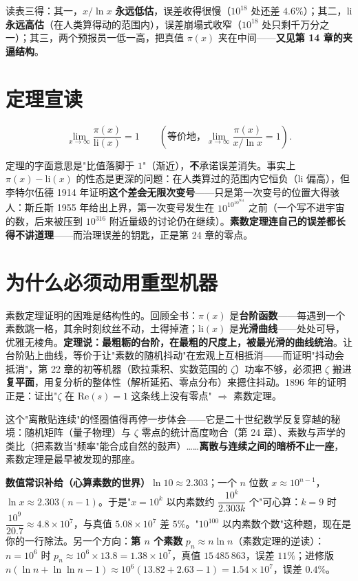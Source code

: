 读表三得：其一，$x/\ln x$ \textbf{永远低估}，误差收得很慢（$10^{18}$ 处还差 $4.6\%$）；其二，$\mathrm{li}$ \textbf{永远高估}（在人类算得动的范围内），误差崩塌式收窄（$10^{18}$ 处只剩千万分之一）；其三，两个预报员一低一高，把真值 $\pi(x)$ 夹在中间——\textbf{又见第 14 章的夹逼结构}。

\section{定理宣读}

\begin{dingli}
\[
\lim_{x \to \infty} \frac{\pi(x)}{\mathrm{li}(x)} = 1
\qquad\left(\text{等价地，} \lim_{x\to\infty} \frac{\pi(x)}{x/\ln x} = 1\right).
\]
\end{dingli}

定理的字面意思是"比值落脚于 $1$"（渐近），\textbf{不}承诺误差消失。事实上 $\pi(x) - \mathrm{li}(x)$ 的性态是更深的问题：在人类算过的范围内它恒负（$\mathrm{li}$ 偏高），但李特尔伍德 1914 年证明\textbf{这个差会无限次变号}——只是第一次变号的位置大得骇人：斯丘斯 1955 年给出上界，第一次变号发生在 $10^{10^{10^{964}}}$ 之前（一个写不进宇宙的数，后来被压到 $10^{316}$ 附近量级的讨论仍在继续）。\textbf{素数定理连自己的误差都长得不讲道理}——而治理误差的钥匙，正是第 24 章的零点。

\section{为什么必须动用重型机器}

素数定理证明的困难是结构性的。回顾全书：$\pi(x)$ 是\textbf{台阶函数}——每遇到一个素数跳一格，其余时刻纹丝不动，土得掉渣；$\mathrm{li}(x)$ 是\textbf{光滑曲线}——处处可导，优雅无棱角。\textbf{定理说：最粗粝的台阶，在最粗的尺度上，被最光滑的曲线统治}。让台阶贴上曲线，等价于让"素数的随机抖动"在宏观上互相抵消——而证明"抖动会抵消"，第 22 章的初等机器（欧拉乘积、实数范围的 $\zeta$）功率不够，必须把 $\zeta$ 搬进\textbf{复平面}，用复分析的整体性（解析延拓、零点分布）来摁住抖动。1896 年的证明正是：证出"$\zeta$ 在 $\mathrm{Re}(s) = 1$ 这条线上没有零点" $\Rightarrow$ 素数定理。

这个"离散贴连续"的怪圈值得再停一步体会——它是二十世纪数学反复穿越的秘境：随机矩阵（量子物理）与 $\zeta$ 零点的统计高度吻合（第 24 章）、素数与声学的类比（把素数当"频率"能合成自然的鼓声）……\textbf{离散与连续之间的暗桥不止一座}，素数定理是最早被发现的那座。

\begin{gongju}
\textbf{数值常识补给（心算素数的世界）}$\ln 10 \approx 2.303$；一个 $n$ 位数 $x\approx10^{n-1}$，$\ln x \approx 2.303(n-1)$。于是"$x = 10^k$ 以内素数约 $\dfrac{10^k}{2.303k}$ 个"可心算：$k=9$ 时 $\dfrac{10^9}{20.7} \approx 4.8\times10^7$，与真值 $5.08\times10^7$ 差 $5\%$。"$10^{100}$ 以内素数个数"这种题，现在是你的一行除法。另一个方向：\textbf{第 $n$ 个素数} $p_n \approx n\ln n$（素数定理的逆读）：$n = 10^6$ 时 $p_n \approx 10^6\times13.8 = 1.38\times10^7$，真值 $15\,485\,863$，误差 $11\%$；进修版 $n(\ln n + \ln\ln n - 1) \approx 10^6(13.82+2.63-1) = 1.54\times10^7$，误差 $0.4\%$。
\end{gongju}

